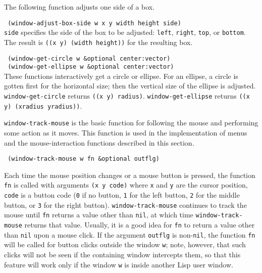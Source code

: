 The following function adjusts one side of a box.

{\tt \hspace*{0.5in} (window-adjust-box-side w x y width height side)} \\

\vspace{-0.15in}
{\tt side} specifies the side of the box to be adjusted: {\tt left},
{\tt right}, {\tt top}, or {\tt bottom}.  The result is
{\tt ((x y) (width height))} for the resulting box.

{\tt \hspace*{0.5in} (window-get-circle w \&optional center:vector)} \\
{\tt \hspace*{0.5in} (window-get-ellipse w \&optional center:vector)} \\
These functions interactively get a circle or ellipse.  For an ellipse,
a circle is gotten first for the horizontal size; then the vertical
size of the ellipse is adjusted.
{\tt window-get-circle} returns {\tt ((x y) radius)}.
{\tt window-get-ellipse} returns {\tt ((x y) (xradius yradius))}.


{\tt window-track-mouse} is the basic function for following the mouse
and performing some action as it moves.  This function is used in
the implementation of menus and the mouse-interaction functions described in
this section.

{\tt \hspace*{0.5in} (window-track-mouse w fn \&optional outflg)}
          
\vspace{-0.05in}
Each time the mouse position changes or a mouse button is pressed,
the function {\tt fn} is called with
arguments {\tt (x y code)} where {\tt x} and {\tt y} are the cursor
position, {\tt code} is a button code ({\tt 0} if no button, {\tt 1} for
the left button, {\tt 2} for the middle button, or {\tt 3} for the right
button).  {\tt window-track-mouse} continues to track the mouse until {\tt fn}
returns a value other than {\tt nil}, at which time {\tt window-track-mouse}
returns that value.  Usually, it is a good idea for {\tt fn} to return a
value other than {\tt nil} upon a mouse click.  If the argument {\tt outflg}
is non-{\tt nil}, the function {\tt fn} will be called for button clicks
outside the window {\tt w}; note, however, that such clicks will not be
seen if the containing window intercepts them, so that this feature will
work only if the window {\tt w} is inside another Lisp user window.



